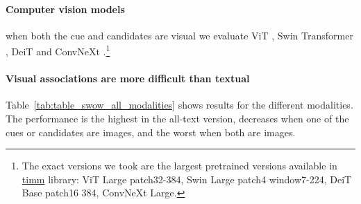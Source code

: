 \documentclass{article}
\begin{document}
\paragraph{Computer vision models} when both the cue and candidates are visual we evaluate ViT \cite{dosovitskiy2020image}, Swin Transformer \cite{liu2021swin}, DeiT \cite{touvron2021training} and ConvNeXt \cite{liu2022convnet}.\footnote{The exact versions we took are the largest pretrained versions available in \href{https://github.com/rwightman/pytorch-image-models}{timm} library: ViT Large patch32-384, Swin Large patch4 window7-224, DeiT Base patch16 384, ConvNeXt Large.} 

\paragraph{Visual associations are more difficult than textual}
Table~\ref{tab:table_swow_all_modalities} shows results for the different modalities. The performance is the highest in the all-text version, decreases when one of the cues or candidates are images, and the worst when both are images. 
\end{document}
